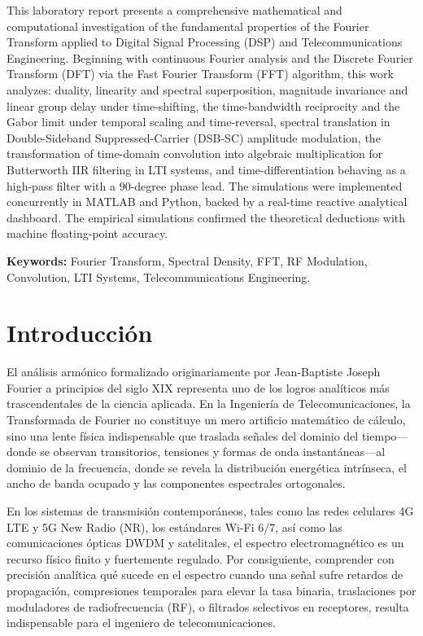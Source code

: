 \documentclass[11pt,a4paper]{article}
\begin{document}
This laboratory report presents a comprehensive mathematical and computational investigation of the fundamental properties of the Fourier Transform applied to Digital Signal Processing (DSP) and Telecommunications Engineering. Beginning with continuous Fourier analysis and the Discrete Fourier Transform (DFT) via the Fast Fourier Transform (FFT) algorithm, this work analyzes: duality, linearity and spectral superposition, magnitude invariance and linear group delay under time-shifting, the time-bandwidth reciprocity and the Gabor limit under temporal scaling and time-reversal, spectral translation in Double-Sideband Suppressed-Carrier (DSB-SC) amplitude modulation, the transformation of time-domain convolution into algebraic multiplication for Butterworth IIR filtering in LTI systems, and time-differentiation behaving as a high-pass filter with a 90-degree phase lead. The simulations were implemented concurrently in MATLAB and Python, backed by a real-time reactive analytical dashboard. The empirical simulations confirmed the theoretical deductions with machine floating-point accuracy.

\vspace{0.4cm}
\noindent\textbf{Keywords:} Fourier Transform, Spectral Density, FFT, RF Modulation, Convolution, LTI Systems, Telecommunications Engineering.

\newpage
\tableofcontents
\newpage

\section{Introducci\'on}

El an\'alisis arm\'onico formalizado originariamente por Jean-Baptiste Joseph Fourier a principios del siglo XIX representa uno de los logros anal\'iticos m\'as trascendentales de la ciencia aplicada. En la Ingenier\'ia de Telecomunicaciones, la Transformada de Fourier no constituye un mero artificio matem\'atico de c\'alculo, sino una lente f\'isica indispensable que traslada se\~nales del dominio del tiempo---donde se observan transitorios, tensiones y formas de onda instant\'aneas---al dominio de la frecuencia, donde se revela la distribuci\'on energ\'etica intr\'inseca, el ancho de banda ocupado y las componentes espectrales ortogonales.

En los sistemas de transmisi\'on contempor\'aneos, tales como las redes celulares 4G LTE y 5G New Radio (NR), los est\'andares Wi-Fi 6/7, as\'i como las comunicaciones \'opticas DWDM y satelitales, el espectro electromagn\'etico es un recurso f\'isico finito y fuertemente regulado. Por consiguiente, comprender con precisi\'on anal\'itica qu\'e sucede en el espectro cuando una se\~nal sufre retardos de propagaci\'on, compresiones temporales para elevar la tasa binaria, traslaciones por moduladores de radiofrecuencia (RF), o filtrados selectivos en receptores, resulta indispensable para el ingeniero de telecomunicaciones.
\end{document}
